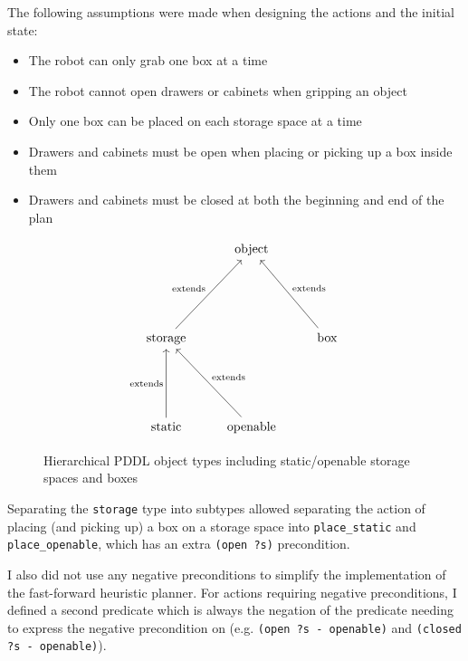 \documentclass{article}
\begin{document}
The following assumptions were made when designing the actions and the initial state:
\begin{itemize}
    \item The robot can only grab one box at a time
    \item The robot cannot open drawers or cabinets when gripping an object
    \item Only one box can be placed on each storage space at a time
    \item Drawers and cabinets must be open when placing or picking up a box inside them
    \item Drawers and cabinets must be closed at both the beginning and end of the plan 
\end{itemize}

\begin{figure}[h]
    \[\begin{tikzcd}
        & {\text{object}} \\
        \\
        \\
        {\text{storage}} && {\text{box}} \\
        \\
        \\
        {\text{static}} & {\text{openable}}
        \arrow["{\text{extends}}", from=4-1, to=1-2]
        \arrow["{\text{extends}}"', from=4-3, to=1-2]
        \arrow["{\text{extends}}"', from=7-2, to=4-1]
        \arrow["{\text{extends}}", from=7-1, to=4-1]
    \end{tikzcd}\]

    \caption{Hierarchical PDDL object types including static/openable storage spaces and boxes}
    \label{fig:types}
\end{figure}

Separating the \texttt{storage} type into subtypes allowed separating the action of placing (and picking up) a box on a storage space into \texttt{place\_static} and \texttt{place\_openable}, which has an extra \texttt{(open ?s)} precondition.

I also did not use any negative preconditions to simplify the implementation of the fast-forward heuristic planner. For actions requiring negative preconditions, I defined a second predicate which is always the negation of the predicate needing to express the negative precondition on (e.g. \texttt{(open ?s - openable)} and \texttt{(closed ?s - openable)}).
\end{document}
